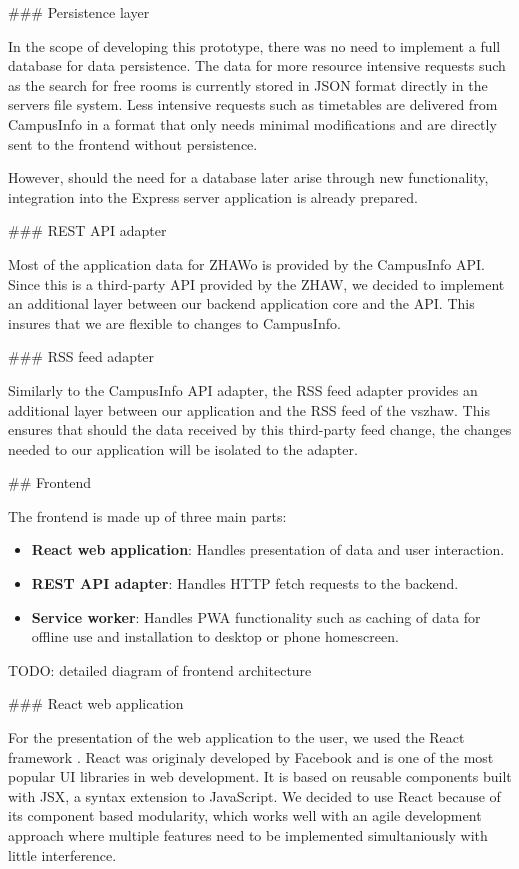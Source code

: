 \begin{markdown}
### Persistence layer

In the scope of developing this prototype, there was no need to implement a full database for data persistence. The data for more resource intensive requests such as the search for free rooms is currently stored in JSON format directly in the servers file system. Less intensive requests such as timetables are delivered from CampusInfo in a format that only needs minimal modifications and are directly sent to the frontend without persistence.

However, should the need for a database later arise through new functionality, integration into the Express server application is already prepared.

### REST API adapter

Most of the application data for ZHAWo is provided by the CampusInfo API. Since this is a third-party API provided by the ZHAW, we decided to implement an additional layer between our backend application core and the API. This insures that we are flexible to changes to CampusInfo.

### RSS feed adapter

Similarly to the CampusInfo API adapter, the RSS feed adapter provides an additional layer between our application and the RSS feed of the vszhaw. This ensures that should the data received by this third-party feed change, the changes needed to our application will be isolated to the adapter.

\newpage

## Frontend

The frontend is made up of three main parts:

\begin{itemize}
  \item \textbf{React web application}: Handles presentation of data and user interaction.
  \item \textbf{REST API adapter}: Handles HTTP fetch requests to the backend.
  \item \textbf{Service worker}: Handles PWA functionality such as caching of data for offline use and installation to desktop or phone homescreen.
\end{itemize}

TODO: detailed diagram of frontend architecture

### React web application

For the presentation of the web application to the user, we used the React framework \cite{React}. React was originaly developed by Facebook and is one of the most popular UI libraries in web development. It is based on reusable components built with JSX, a syntax extension to JavaScript. We decided to use React because of its component based modularity, which works well with an agile development approach where multiple features need to be implemented simultaniously with little interference. 


\end{markdown}
